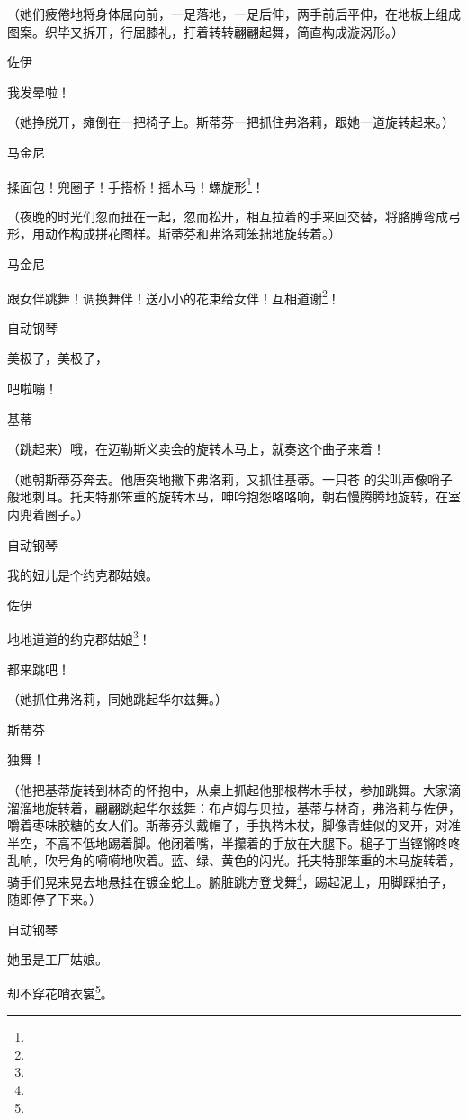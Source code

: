 \par （她们疲倦地将身体屈向前，一足落地，一足后伸，两手前后平伸，在地板上组成图案。织毕又拆开，行屈膝礼，打着转转翩翩起舞，简直构成漩涡形。）
\par 佐伊
\par 我发晕啦！
\par （她挣脱开，瘫倒在一把椅子上。斯蒂芬一把抓住弗洛莉，跟她一道旋转起来。）
\par 马金尼
\par 揉面包！兜圈子！手搭桥！摇木马！螺旋形\footnote{}！
\par （夜晚的时光们忽而扭在一起，忽而松开，相互拉着的手来回交替，将胳膊弯成弓形，用动作构成拼花图样。斯蒂芬和弗洛莉笨拙地旋转着。）
\par 马金尼
\par 跟女伴跳舞！调换舞伴！送小小的花束给女伴！互相道谢\footnote{}！
\par 自动钢琴
\par 美极了，美极了，
\par 吧啦嘣！
\par 基蒂
\par （跳起来）哦，在迈勒斯义卖会的旋转木马上，就奏这个曲子来着！
\par （她朝斯蒂芬奔去。他唐突地撇下弗洛莉，又抓住基蒂。一只苍 的尖叫声像哨子般地刺耳。托夫特那笨重的旋转木马，呻吟抱怨咯咯响，朝右慢腾腾地旋转，在室内兜着圈子。）
\par 自动钢琴
\par 我的妞儿是个约克郡姑娘。
\par 佐伊
\par 地地道道的约克郡姑娘\footnote{}！
\par 都来跳吧！
\par （她抓住弗洛莉，同她跳起华尔兹舞。）
\par 斯蒂芬
\par 独舞！
\par （他把基蒂旋转到林奇的怀抱中，从桌上抓起他那根梣木手杖，参加跳舞。大家滴溜溜地旋转着，翩翩跳起华尔兹舞：布卢姆与贝拉，基蒂与林奇，弗洛莉与佐伊，嚼着枣味胶糖的女人们。斯蒂芬头戴帽子，手执梣木杖，脚像青蛙似的叉开，对准半空，不高不低地踢着脚。他闭着嘴，半攥着的手放在大腿下。槌子丁当铿锵咚咚乱响，吹号角的嗬嗬地吹着。蓝、绿、黄色的闪光。托夫特那笨重的木马旋转着，骑手们晃来晃去地悬挂在镀金蛇上。腑脏跳方登戈舞\footnote{}，踢起泥土，用脚踩拍子，随即停了下来。）
\par 自动钢琴
\par 她虽是工厂姑娘。
\par 却不穿花哨衣裳\footnote{}。
